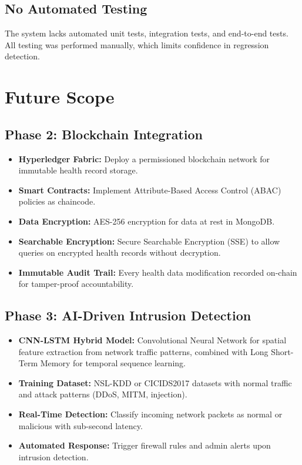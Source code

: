 \documentclass[12pt,a4paper]{report}
\begin{document}
\subsection{No Automated Testing}
The system lacks automated unit tests, integration tests, and end-to-end tests. All testing was performed manually, which limits confidence in regression detection.

\section{Future Scope}

\subsection{Phase 2: Blockchain Integration}
\begin{itemize}[leftmargin=*]
    \item \textbf{Hyperledger Fabric:} Deploy a permissioned blockchain network for immutable health record storage.
    \item \textbf{Smart Contracts:} Implement Attribute-Based Access Control (ABAC) policies as chaincode.
    \item \textbf{Data Encryption:} AES-256 encryption for data at rest in MongoDB.
    \item \textbf{Searchable Encryption:} Secure Searchable Encryption (SSE) to allow queries on encrypted health records without decryption.
    \item \textbf{Immutable Audit Trail:} Every health data modification recorded on-chain for tamper-proof accountability.
\end{itemize}

\subsection{Phase 3: AI-Driven Intrusion Detection}
\begin{itemize}[leftmargin=*]
    \item \textbf{CNN-LSTM Hybrid Model:} Convolutional Neural Network for spatial feature extraction from network traffic patterns, combined with Long Short-Term Memory for temporal sequence learning.
    \item \textbf{Training Dataset:} NSL-KDD or CICIDS2017 datasets with normal traffic and attack patterns (DDoS, MITM, injection).
    \item \textbf{Real-Time Detection:} Classify incoming network packets as normal or malicious with sub-second latency.
    \item \textbf{Automated Response:} Trigger firewall rules and admin alerts upon intrusion detection.
\end{itemize}
\end{document}
